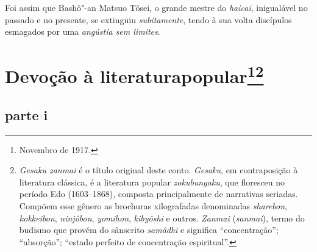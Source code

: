 Foi assim que Bashô"-an Matsuo Tôsei, o grande mestre do \emph{haicai},
inigualável no passado e no presente, se extinguiu \textit{subitamente}, 
tendo à sua volta discípulos esmagados por uma \textit{angústia sem limites}.

\chapter[Devoção à literatura popular]{Devoção à literatura\break popular\footnote{Novembro de 1917.}\footnote{\textit{Gesaku zanmai}
é o título original deste conto. \textit{Gesaku}, em contraposição à literatura clássica, é
a literatura popular \textit{zokubungaku}, que floresceu no período Edo
(1603--1868), composta principalmente de narrativas seriadas. Compõem
esse gênero as brochuras xilografadas denominadas \textit{sharebon},
\textit{kokkeibon}, \textit{ninjôbon}, \textit{yomihon},
\textit{kibyôshi} e outros. \textit{Zanmai} (\textit{sanmai}), termo do
budismo que provém do sânscrito \textit{samâdhi} e significa ``concentração'';
``absorção''; ``estado perfeito de concentração espiritual''.}}

\section*{parte i}

